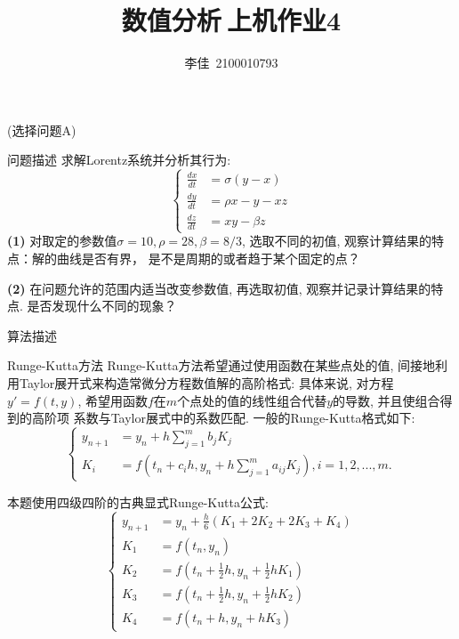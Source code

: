 \documentclass{article}
\title{\textbf{数值分析$\ $上机作业4}}
\author{李佳~2100010793}
\date{}
\begin{document}
\maketitle
(选择问题A)
\begin{section}{问题描述}
    求解Lorentz系统并分析其行为:
    $$\left\{\begin{aligned}
        \frac{dx}{dt}&=\sigma(y-x)\\
        \frac{dy}{dt}&=\rho x-y-xz\\
        \frac{dz}{dt}&=xy-\beta z
    \end{aligned}\right.$$
    \noindent\textbf{(1)} 对取定的参数值$\sigma=10,\rho=28,\beta=8/3$, 选取不同的初值, 观察计算结果的特点：解的曲线是否有界，
    是不是周期的或者趋于某个固定的点？
    
    \noindent\textbf{(2)} 在问题允许的范围内适当改变参数值, 再选取初值, 观察并记录计算结果的特点. 是否发现什么不同的现象？
\end{section}
\begin{section}{算法描述}
\begin{subsection}{Runge-Kutta方法}
    Runge-Kutta方法希望通过使用函数在某些点处的值, 间接地利用Taylor展开式来构造常微分方程数值解的高阶格式: 
    具体来说, 对方程$y'=f(t,y)$, 希望用函数$f$在$m$个点处的值的线性组合代替$y$的导数, 并且使组合得到的高阶项
    系数与Taylor展式中的系数匹配. 一般的Runge-Kutta格式如下:
    $$\left\{\begin{aligned}
     y_{n+1}&=y_n+h\sum_{j=1}^m b_jK_j \\
     K_i &= f(t_n+c_ih,y_n+h\sum_{j=1}^m a_{ij}K_j),i=1,2,...,m.
    \end{aligned}\right.$$
 
    本题使用四级四阶的古典显式Runge-Kutta公式:
    $$\left\{\begin{aligned}
     y_{n+1}&=y_n+\frac{h}{6}(K_1+2K_2+2K_3+K_4) \\
     K_1 &= f(t_n,y_n)\\
     K_2 &= f(t_n+\frac{1}{2}h,y_n+\frac{1}{2}hK_1)\\
     K_3 &= f(t_n+\frac{1}{2}h,y_n+\frac{1}{2}hK_2)\\
     K_4 &= f(t_n+h,y_n+hK_3)
    \end{aligned}\right.$$
\end{subsection}

\end{section}
\end{document}
